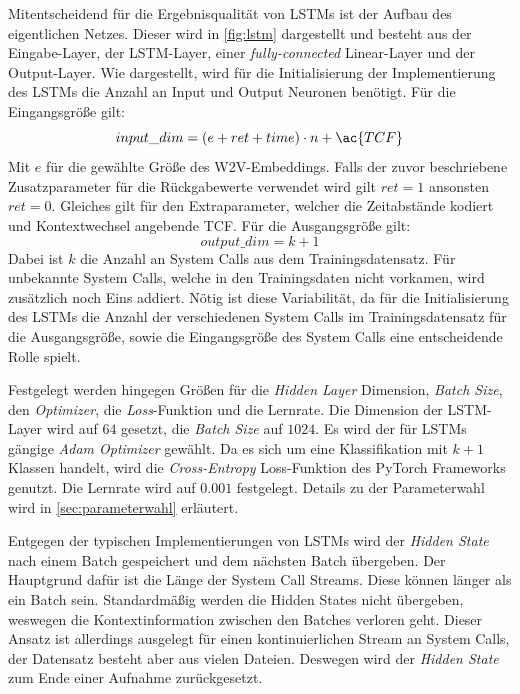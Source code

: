         Mitentscheidend für die Ergebnisqualität von \acp{LSTM} ist der Aufbau des eigentlichen Netzes.
        Dieser wird in \autoref{fig:lstm} dargestellt und besteht aus der Eingabe-Layer, der \ac{LSTM}-Layer, einer \textit{fully-connected} Linear-Layer und der Output-Layer.
        Wie dargestellt, wird für die Initialisierung der Implementierung des \acp{LSTM} die Anzahl an Input und Output Neuronen benötigt.
        Für die Eingangsgröße gilt:
        \begin{equation}
            input\_dim = (e + ret + time) \cdot n + \ac{TCF}
        \end{equation}
        Mit $e$ für die gewählte Größe des \ac{W2V}-Embeddings.
        Falls der zuvor beschriebene Zusatzparameter für die Rückgabewerte verwendet wird gilt $ret=1$ ansonsten $ret=0$.
        Gleiches gilt für den Extraparameter, welcher die Zeitabstände kodiert und Kontextwechsel angebende \ac{TCF}.
        Für die Ausgangsgröße gilt:
        \begin{equation}
            output\_dim = k + 1
        \end{equation}
        Dabei ist $k$ die Anzahl an System Calls aus dem Trainingsdatensatz.
        Für unbekannte System Calls, welche in den Trainingsdaten nicht vorkamen, wird zusätzlich noch Eins addiert.
        Nötig ist diese Variabilität, da für die Initialisierung des \acp{LSTM} die Anzahl der verschiedenen System Calls im Trainingsdatensatz für die Ausgangsgröße, sowie die Eingangsgröße des System Calls eine entscheidende Rolle spielt.\par\medskip

        Festgelegt werden hingegen Größen für die \textit{Hidden Layer} Dimension, \textit{Batch Size}, den \textit{Optimizer}, die \textit{Loss}-Funktion und die Lernrate.
        Die Dimension der \ac{LSTM}-Layer wird auf $64$ gesetzt, die \textit{Batch Size} auf $1024$.
        Es wird der für \acp{LSTM} gängige \textit{Adam Optimizer} gewählt.
        Da es sich um eine Klassifikation mit $k+1$ Klassen handelt, wird die \textit{Cross-Entropy} Loss-Funktion des PyTorch Frameworks genutzt.
        Die Lernrate wird auf $0.001$ festgelegt.
        Details zu der Parameterwahl wird in \autoref{sec:parameterwahl} erläutert.\par\medskip

        Entgegen der typischen Implementierungen von \acp{LSTM} wird der \textit{Hidden State} nach einem Batch gespeichert und dem nächsten Batch  übergeben. 
        Der Hauptgrund dafür ist die Länge der System Call Streams.
        Diese können länger als ein Batch sein.
        Standardmäßig werden die Hidden States nicht übergeben, weswegen die Kontextinformation zwischen den Batches verloren geht.
        Dieser Ansatz ist allerdings ausgelegt für einen kontinuierlichen Stream an System Calls, der Datensatz besteht aber aus vielen Dateien.
        Deswegen wird der \textit{Hidden State} zum Ende einer Aufnahme zurückgesetzt.\par\medskip

